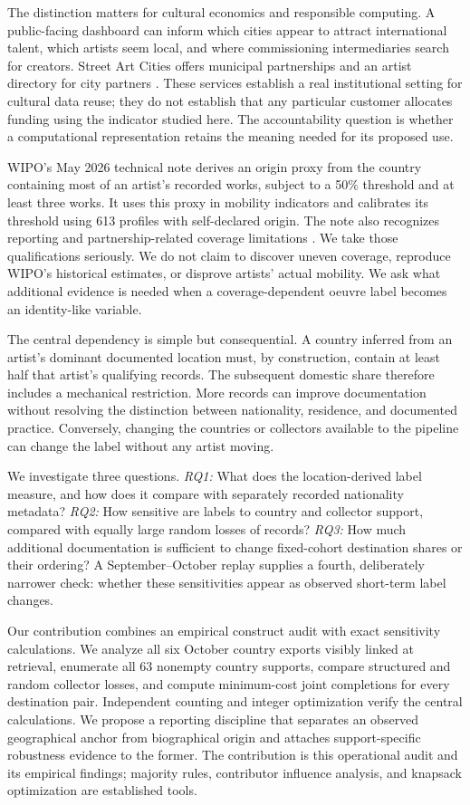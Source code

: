 The distinction matters for cultural economics and responsible computing. A public-facing dashboard can inform which cities appear to attract international talent, which artists seem local, and where commissioning intermediaries search for creators. Street Art Cities offers municipal partnerships and an artist directory for city partners \cite{sacpartners,sacdirectory}. These services establish a real institutional setting for cultural data reuse; they do not establish that any particular customer allocates funding using the indicator studied here. The accountability question is whether a computational representation retains the meaning needed for its proposed use.

WIPO's May 2026 technical note derives an origin proxy from the country containing most of an artist's recorded works, subject to a 50\% threshold and at least three works. It uses this proxy in mobility indicators and calibrates its threshold using 613 profiles with self-declared origin. The note also recognizes reporting and partnership-related coverage limitations \cite{wipo2026}. We take those qualifications seriously. We do not claim to discover uneven coverage, reproduce WIPO's historical estimates, or disprove artists' actual mobility. We ask what additional evidence is needed when a coverage-dependent oeuvre label becomes an identity-like variable.

The central dependency is simple but consequential. A country inferred from an artist's dominant documented location must, by construction, contain at least half that artist's qualifying records. The subsequent domestic share therefore includes a mechanical restriction. More records can improve documentation without resolving the distinction between nationality, residence, and documented practice. Conversely, changing the countries or collectors available to the pipeline can change the label without any artist moving.

We investigate three questions. \emph{RQ1:} What does the location-derived label measure, and how does it compare with separately recorded nationality metadata? \emph{RQ2:} How sensitive are labels to country and collector support, compared with equally large random losses of records? \emph{RQ3:} How much additional documentation is sufficient to change fixed-cohort destination shares or their ordering? A September--October replay supplies a fourth, deliberately narrower check: whether these sensitivities appear as observed short-term label changes.

Our contribution combines an empirical construct audit with exact sensitivity calculations. We analyze all six October country exports visibly linked at retrieval, enumerate all 63 nonempty country supports, compare structured and random collector losses, and compute minimum-cost joint completions for every destination pair. Independent counting and integer optimization verify the central calculations. We propose a reporting discipline that separates an observed geographical anchor from biographical origin and attaches support-specific robustness evidence to the former. The contribution is this operational audit and its empirical findings; majority rules, contributor influence analysis, and knapsack optimization are established tools.

